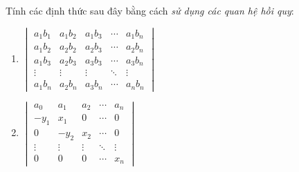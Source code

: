 \begin{exercise}
    Tính các định thức sau đây bằng cách \textit{sử dụng các quan hệ hồi quy}:
    \begin{enumerate}[label = (\alph*)]
        \item $\begin{vmatrix}
                      a_{1}b_{1} & a_{1}b_{2} & a_{1}b_{3} & \cdots & a_{1}b_{n} \\
                      a_{1}b_{2} & a_{2}b_{2} & a_{2}b_{3} & \cdots & a_{2}b_{n} \\
                      a_{1}b_{3} & a_{2}b_{3} & a_{3}b_{3} & \cdots & a_{3}b_{n} \\
                      \vdots     & \vdots     & \vdots     & \ddots & \vdots     \\
                      a_{1}b_{n} & a_{2}b_{n} & a_{3}b_{n} & \cdots & a_{n}b_{n}
                  \end{vmatrix}$
        \item $\begin{vmatrix}
                      a_{0}  & a_{1}  & a_{2}  & \cdots & a_{n}  \\
                      -y_{1} & x_{1}  & 0      & \cdots & 0      \\
                      0      & -y_{2} & x_{2}  & \cdots & 0      \\
                      \vdots & \vdots & \vdots & \ddots & \vdots \\
                      0      & 0      & 0      & \cdots & x_{n}
                  \end{vmatrix}$
    \end{enumerate}
\end{exercise}

